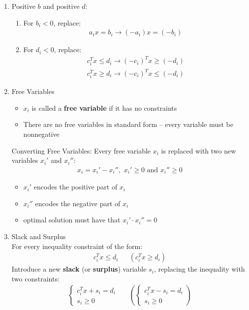 \documentclass{article}
\newcommand{\gap}{\medskip\\}
\begin{document}
\begin{enumerate}
    \item Positive $b$ and positive $d$:
    \begin{enumerate}
        \item For $b_i < 0$, replace:
        \begin{align*}
            a_i x = b_i \to (-a_i)x = (-b_i)
        \end{align*}
        \item For $d_i < 0$, replace:
        \begin{align*}
            c_i^Tx \leq d_i \to (-c_i)^T x \geq (-d_i)\\
            c_i^Tx \geq d_i \to (-c_i)^Tx \leq (-d_i)
        \end{align*}
    \end{enumerate}
    \item Free Variables 
    \begin{itemize}
        \item $x_i$ is called a \textbf{free variable} if it has 
        no constraints
        \item There are no free variables in standard form -- every 
        variable must be nonnegative
    \end{itemize}
    Converting Free Variables: Every free variable $x_i$ is replaced
    with two new variables $x_i'$ and $x_i''$:
    \begin{align*}
        x_i = x_i' - x_i'', \,\, x_i' \geq 0 \textrm{  and  } x_i'' \geq 0
    \end{align*}
    \begin{itemize}
        \item $x_i'$ encodes the positive part of $x_i$
        \item $x_i''$ encodes the negative part of $x_i$
        \item optimal solution must have that $x_i' \cdot x_i'' = 0$
    \end{itemize}
    \item Slack and Surplus
    \gap 
    For every inequality constraint of the form:
    \begin{align*}
        c_i^Tx \leq d_i && (c_i^Tx \geq d_i)
    \end{align*}
    Introduce a new \textbf{slack} (or \textbf{surplus}) variable $s_i$, 
    replacing the inequality with two constraints:
    \begin{align*}
        \begin{cases}
            c_i^Tx + s_i = d_i\\
            s_i \geq 0
        \end{cases}
        &&
        \left(
            \begin{cases}
                c_i^Tx - s_i = d_i\\
                s_i \geq 0
            \end{cases}
        \right)
    \end{align*}
\end{enumerate}
\end{document}
